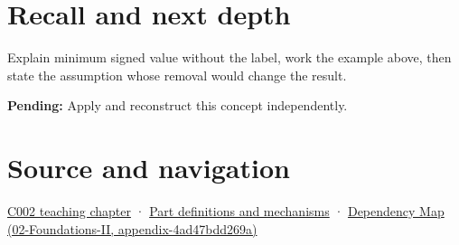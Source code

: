 \section{Recall and next depth}\label{appendix-05f39b10364d-recall-and-next-depth}

Explain minimum signed value without the label, work the example above, then state the assumption whose removal would change the result.

\textbf{Pending:} Apply and reconstruct this concept independently.

\section{Source and navigation}\label{appendix-05f39b10364d-source-and-navigation}

\href{Continuous\%20Notes/Computing\%20Foundations\%20-\%20From\%20Bits\%20to\%20C++\%20and\%20Systems\%20APIs\#Arithmetic\%20becomes\%20a\%20policy}{C002 teaching chapter} · \hyperref[appendix-fd090d982a15]{Part definitions and mechanisms} · \href{../02-Foundations-II/main.pdf\#nameddest=appendix-4ad47bdd269a}{Dependency Map (02-Foundations-II, appendix-4ad47bdd269a)}

